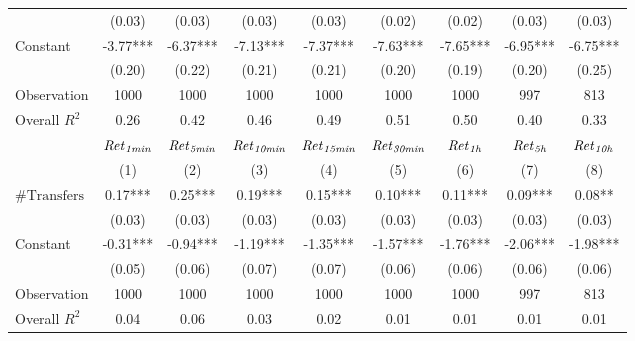\begin{tabular}{lcccccccc}
 & (0.03) & (0.03) & (0.03) & (0.03) & (0.02) & (0.02) & (0.03) & (0.03) \\
Constant & -3.77*** & -6.37*** & -7.13*** & -7.37*** & -7.63*** & -7.65*** & -6.95*** & -6.75*** \\
 & (0.20) & (0.22) & (0.21) & (0.21) & (0.20) & (0.19) & (0.20) & (0.25) \\
Observation & 1000 & 1000 & 1000 & 1000 & 1000 & 1000 & 997 & 813 \\
Overall $R^2$ & 0.26 & 0.42 & 0.46 & 0.49 & 0.51 & 0.50 & 0.40 & 0.33 \\
\hline
 & ${\it Ret}_{\it 1min}$ & ${\it Ret}_{\it 5min}$ & ${\it Ret}_{\it 10min}$ & ${\it Ret}_{\it 15min}$ & ${\it Ret}_{\it 30min}$ & ${\it Ret}_{\it 1h}$ & ${\it Ret}_{\it 5h}$ & ${\it Ret}_{\it 10h}$ \\
 & (1) & (2) & (3) & (4) & (5) & (6) & (7) & (8) \\
\hline
$\#\text{Transfers}$ & 0.17*** & 0.25*** & 0.19*** & 0.15*** & 0.10*** & 0.11*** & 0.09*** & 0.08** \\
 & (0.03) & (0.03) & (0.03) & (0.03) & (0.03) & (0.03) & (0.03) & (0.03) \\
Constant & -0.31*** & -0.94*** & -1.19*** & -1.35*** & -1.57*** & -1.76*** & -2.06*** & -1.98*** \\
 & (0.05) & (0.06) & (0.07) & (0.07) & (0.06) & (0.06) & (0.06) & (0.06) \\
Observation & 1000 & 1000 & 1000 & 1000 & 1000 & 1000 & 997 & 813 \\
Overall $R^2$ & 0.04 & 0.06 & 0.03 & 0.02 & 0.01 & 0.01 & 0.01 & 0.01 \\
\hline
\end{tabular}
